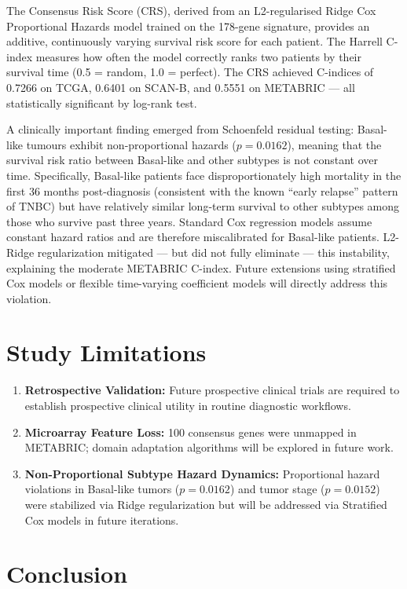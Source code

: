 \documentclass[10pt,a4paper,twocolumn]{article}
\begin{document}
The Consensus Risk Score (CRS), derived from an L2-regularised Ridge Cox Proportional Hazards model trained on the 178-gene signature, provides an additive, continuously varying survival risk score for each patient. The Harrell C-index measures how often the model correctly ranks two patients by their survival time (0.5 = random, 1.0 = perfect). The CRS achieved C-indices of 0.7266 on TCGA, 0.6401 on SCAN-B, and 0.5551 on METABRIC --- all statistically significant by log-rank test.

A clinically important finding emerged from Schoenfeld residual testing: Basal-like tumours exhibit non-proportional hazards ($p = 0.0162$), meaning that the survival risk ratio between Basal-like and other subtypes is not constant over time. Specifically, Basal-like patients face disproportionately high mortality in the first 36 months post-diagnosis (consistent with the known ``early relapse'' pattern of TNBC) but have relatively similar long-term survival to other subtypes among those who survive past three years. Standard Cox regression models assume constant hazard ratios and are therefore miscalibrated for Basal-like patients. L2-Ridge regularization mitigated --- but did not fully eliminate --- this instability, explaining the moderate METABRIC C-index. Future extensions using stratified Cox models or flexible time-varying coefficient models will directly address this violation.

\section{Study Limitations}

\begin{enumerate}
    \item \textbf{Retrospective Validation:} Future prospective clinical trials are required to establish prospective clinical utility in routine diagnostic workflows.
    \item \textbf{Microarray Feature Loss:} 100 consensus genes were unmapped in METABRIC; domain adaptation algorithms will be explored in future work.
    \item \textbf{Non-Proportional Subtype Hazard Dynamics:} Proportional hazard violations in Basal-like tumors ($p=0.0162$) and tumor stage ($p=0.0152$) were stabilized via Ridge regularization but will be addressed via Stratified Cox models in future iterations.
\end{enumerate}

\section{Conclusion}
\end{document}
